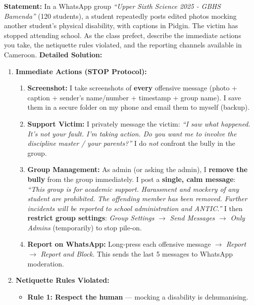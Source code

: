\documentclass[11pt]{article}
\begin{document}
\begin{exoresolu}
    \textbf{Statement:} In a WhatsApp group \textit{``Upper Sixth Science 2025 - GBHS Bamenda''} (120 students), a student repeatedly posts edited photos mocking another student's physical disability, with captions in Pidgin. The victim has stopped attending school. As the class prefect, describe the immediate actions you take, the netiquette rules violated, and the reporting channels available in Cameroon.
    \tcblower
    \textbf{Detailed Solution:}
    \begin{enumerate}
        \item \textbf{Immediate Actions (STOP Protocol):}
              \begin{enumerate}
                  \item \textbf{Screenshot:} I take screenshots of \textbf{every} offensive message (photo + caption + sender's name/number + timestamp + group name). I save them in a secure folder on my phone and email them to myself (backup).
                  \item \textbf{Support Victim:} I privately message the victim: \textit{``I saw what happened. It's not your fault. I'm taking action. Do you want me to involve the discipline master / your parents?''} I do \emph{not} confront the bully in the group.
                  \item \textbf{Group Management:} As admin (or asking the admin), I \textbf{remove the bully} from the group immediately. I post a \textbf{single, calm message}: \textit{``This group is for academic support. Harassment and mockery of any student are prohibited. The offending member has been removed. Further incidents will be reported to school administration and ANTIC.''} I then \textbf{restrict group settings}: \textit{Group Settings $\rightarrow$ Send Messages $\rightarrow$ Only Admins} (temporarily) to stop pile-on.
                  \item \textbf{Report on WhatsApp:} Long-press each offensive message $\rightarrow$ \textit{Report} $\rightarrow$ \textit{Report and Block}. This sends the last 5 messages to WhatsApp moderation.
              \end{enumerate}
        \item \textbf{Netiquette Rules Violated:}
              \begin{itemize}
                  \item \textbf{Rule 1: Respect the human} — mocking a disability is dehumanising.

\end{itemize}
\end{enumerate}
\end{exoresolu}
\end{document}
